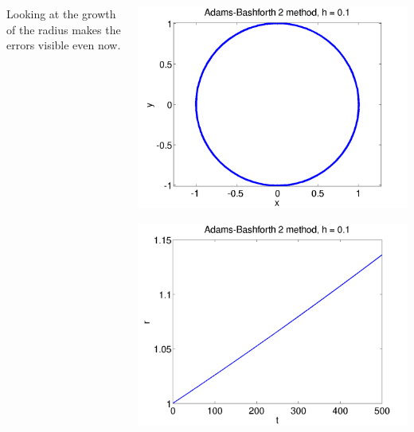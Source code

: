 \documentclass{beamer}
\begin{document}
\begin{frame}
\begin{columns}
\begin{column}{0.5\textwidth}
\begin{overlayarea}{\textwidth}{0.4\textheight}
{          \vspace{1ex}
          Looking at the growth of the radius makes the errors
          visible even now.
        }
      \end{overlayarea}
    \end{column}
    \begin{column}{0.5\textwidth}
      \begin{overlayarea}{\textwidth}{0.6\textheight}
        {
          \begin{center}
            \includegraphics[height=0.5\textheight]{figures/AB2_1}
          \end{center}
        }
        {
          \begin{center}
            \includegraphics[height=0.5\textheight]{figures/AB2_rad1}

\end{center}}
\end{overlayarea}
\end{column}
\end{columns}
\end{frame}
\end{document}
